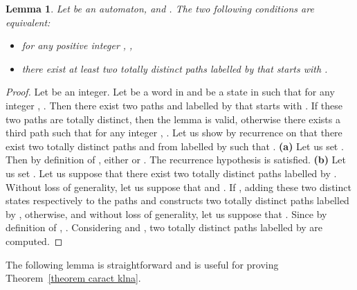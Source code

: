 \documentclass[11pt]{elsarticle}
\newtheorem{lemma}{Lemma}
\newcommand\modif[2]{{#2}}
\begin{document}
\begin{lemma}\label{lem 2chem imp 2 chem tot dis}
  Let  be an automaton,  and . The two following conditions are equivalent:
  \begin{itemize}
\item  for any positive integer , ,
\item  there \modif{exists}{exist} at least two totally distinct paths labelled by  that starts with .
\end{itemize}
\end{lemma}
\begin{proof}
  Let  be an integer. Let  be a word in  and  be a state in  
such that for any integer , . Then there \modif{exists}{exist} two paths  and  labelled by  that starts with . If these two paths are totally distinct, then the lemma is valid, otherwise there exists a third path  such that for any integer ,   . Let us show by recurrence on  that there \modif{exists}{exist} two totally distinct paths  and  from  labelled by  such that . 
  \textbf{(a)} Let us set . Then by definition of , either  or . \modif{R}{The r}ecurrence hypothesis is satisfied.
  \textbf{(b)} Let us set . Let us suppose that there \modif{exists}{exist} two totally distinct paths labelled by . Without loss of generality, let us suppose that  and . If , adding these two distinct states respectively to the paths  and  constructs two totally distinct paths labelled by , otherwise, and without loss of generality, let us suppose that . Since by definition of ,   . Considering  and ,  two totally distinct paths labelled by  are computed.

  
\end{proof}

\modif{}{The  following lemma is straightforward and is useful  for  proving  Theorem~\ref{theorem caract klna}.}

\modif{\begin{lemma}\label{lem 2chem total dis 1 chem car}
  Let  be an automaton and  be its square-automaton. Let  be a word in  and  be a state in . If there \modif{exists}{exist} two totally distinct paths labelled by  that starts with  in , then there exists a path  in  labelled by  starting with  such that for any integer ,  with .
\end{lemma}}{}
\modif{\begin{proof}
  Let  and .
  
  Let  and  be two totally distinct paths labelled by  such that . Let . Let us show by recurrence on the length of  that  is a path in  labelled by  that starts with  such that for any integer ,  with .
  
  Since , it holds that .
  
  Let . Since  and  are two distinct path labelled by , then . Hence, .  Furthermore, since  and  are totally distinct, .
  
  Let . Suppose that for any integer ,  in  is labelled by  starting with  such that for any integer ,  with . Since by definition of  and ,  belongs to  and  belongs to , it holds that  belongs to . Hence . Furthermore, since  and  are totally distinct, .
  
\end{proof}}{}
\end{document}
